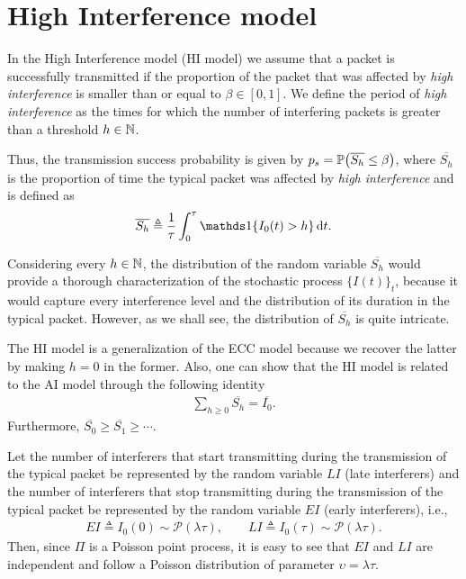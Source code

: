 \section{High Interference model}
\label{sec:HI_model}

In the High Interference model (HI model) we assume that a packet is successfully transmitted if the proportion of the packet that was affected by \textit{high interference} is smaller than or equal to $\beta\in[0,1]$. We define the period of \textit{high interference} as the times for which the number of interfering packets is greater than a threshold $h\in\N$.

Thus, the transmission success probability is given by $p_s = \P\!\left(\overline{S_h} \le \beta\right)$, where $\overline{S_h}$ is the proportion of time the typical packet was affected by \textit{high interference} and is defined as
\begin{align}\label{eq:Sh_def}
    \overline{S_h} \triangleq \frac{1}{\tau}\int_0^\tau \ind\{I_0(t) > h\}\,\d t.
\end{align}

Considering every $h\in\N$, the distribution of the random variable $\overline{S_h}$ would provide a thorough characterization of the stochastic process $\{I(t)\}_t$,
%
because it would capture every interference level and the distribution of its duration in the typical packet.
%
However, as we shall see, the distribution of $\overline{S_h}$ is quite intricate.

\begin{remark} \label{remark:Ch5_ineq}
    The HI model is a generalization of the ECC model because we recover the latter by making $h=0$ in the former.
    Also, one can show that the HI model is related to the AI model through the following identity
    \begin{align*}
        \sum_{h\ge 0} \overline{S_h} = \overline{I_0}.
    \end{align*}
    Furthermore, $\overline{S_0} \ge \overline{S_1} \ge \cdots$.
\end{remark}

Let the number of interferers that start transmitting during the transmission of the typical packet be represented by the random variable $LI$ (late interferers) and the number of interferers that stop transmitting during the transmission of the typical packet be represented by the random variable $EI$ (early interferers), i.e.,
\begin{align*}
    EI \triangleq I_0(0) \sim \mathscr{P}(\lambda\tau), \qquad LI \triangleq I_0(\tau) \sim \mathscr{P}(\lambda\tau).
\end{align*}
Then, since $\Pi$ is a Poisson point process, it is easy to see that $EI$ and $LI$ are independent and follow a Poisson distribution of parameter $\upsilon = \lambda\tau$.


